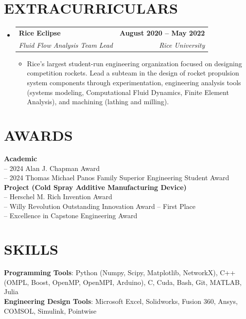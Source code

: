 \documentclass[letterpaper,11pt]{article}
\makeatletter
\newcommand{\resumeItem}[1]{
  \item \small{
    {#1 \vspace{-2pt}}
  }
}
\newcommand{\resumeSubheading}[4]{
  \vspace{-2pt}\item
    \begin{tabular*}{1.0\textwidth}[t]{l@{\extracolsep{\fill}}r}
      \textbf{#1} & \textbf{\small #2} \\
      \textit{\small#3} & \textit{\small #4} \\
    \end{tabular*}\vspace{-7pt}
}
\newcommand{\resumeSubHeadingListStart}{\begin{itemize}[leftmargin=0.0in, label={}]}
\newcommand{\resumeSubHeadingListEnd}{\end{itemize}}
\newcommand{\resumeItemListStart}{\begin{itemize}}
\newcommand{\resumeItemListEnd}{\end{itemize}\vspace{-5pt}}
\makeatother
\begin{document}
\section{EXTRACURRICULARS}
    
    \resumeSubHeadingListStart
        
        \resumeSubheading{Rice Eclipse}{August 2020 -- May 2022}{Fluid Flow Analysis Team Lead}{Rice University}
          \resumeItemListStart
             \resumeItem{Rice's largest student-run engineering organization focused on designing competition rockets. Lead a subteam in the design of rocket propulsion system components through experimentation, engineering analysis tools (systems modeling, Computational Fluid Dynamics, Finite Element Analysis), and machining (lathing and milling).}
          \resumeItemListEnd   
        
    \resumeSubHeadingListEnd
\vspace{-16pt}

\section{AWARDS}
 \begin{itemize}[leftmargin=0.15in, label={}]
    \small{\item{
     \textbf{Academic} \\
     {-- 2024 Alan J. Chapman Award} \\
     {-- 2024 Thomas Michael Panos Family Superior Engineering Student Award} \\
     \vspace{2pt}
     \textbf{Project (Cold Spray Additive Manufacturing Device)} \\
     {-- Herschel M. Rich Invention Award} \\
     {-- Willy Revolution Outstanding Innovation Award -- First Place}\\ 
     {-- Excellence in Capstone Engineering Award} \\
    }}
 \end{itemize}
 \vspace{-16pt}

\section{SKILLS}
 \begin{itemize}[leftmargin=0.15in, label={}]
    \small{\item{
     \textbf{Programming Tools}{: Python (Numpy, Scipy, Matplotlib, NetworkX), C++ (OMPL, Boost, OpenMP, OpenMPI, Arduino), C, Cuda, Bash, Git, MATLAB, Julia} \\
     \textbf{Engineering Design Tools}{: Microsoft Excel, Solidworks, Fusion 360, Ansys, COMSOL, Simulink, Pointwise} \\
    }}
 \end{itemize}
 \vspace{-16pt}
\end{document}
